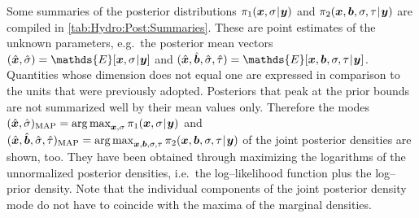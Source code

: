 \par %
Some summaries of the posterior distributions \(\pi_1(\bm{x},\sigma {\:\!}|{\:\!} \bm{y})\) and \(\pi_2(\bm{x},\bm{b},\sigma,\tau {\:\!}|{\:\!} \bm{y})\) are compiled in \cref{tab:Hydro:Post:Summaries}.
These are point estimates of the unknown parameters, e.g.\ the posterior mean vectors \((\hat{\bm{x}},\hat{\sigma}) = \mathds{E}[\bm{x},\sigma \cond \bm{y}]\)
and \((\hat{\bm{x}},\hat{\bm{b}},\hat{\sigma},\hat{\tau}) = \mathds{E}[\bm{x},\bm{b},\sigma,\tau \cond \bm{y}]\).
Quantities whose dimension does not equal one are expressed in comparison to the units that were previously adopted.
Posteriors that peak at the prior bounds are not summarized well by their mean values only.
Therefore the modes \((\hat{\bm{x}},\hat{\sigma})_{\mathrm{MAP}} = \operatorname{arg\,max}_{\bm{x},\sigma} \pi_1(\bm{x},\sigma {\:\!}|{\:\!} \bm{y})\) and
\((\hat{\bm{x}},\hat{\bm{b}},\hat{\sigma},\hat{\tau})_{\mathrm{MAP}} = \operatorname{arg\,max}_{\bm{x},\bm{b},\sigma,\tau} \pi_2(\bm{x},\bm{b},\sigma,\tau {\:\!}|{\:\!} \bm{y})\)
of the joint posterior densities are shown, too.
They have been obtained through maximizing the logarithms of the unnormalized posterior densities, i.e.\ the log--likelihood function plus the log--prior density.
Note that the individual components of the joint posterior density mode do not have to coincide with the maxima of the marginal densities.
\begin{table}[htbp]
  \caption[Posterior summaries]{Posterior summaries.}
  \label{tab:Hydro:Post:Summaries}
  \centering
\end{table}
